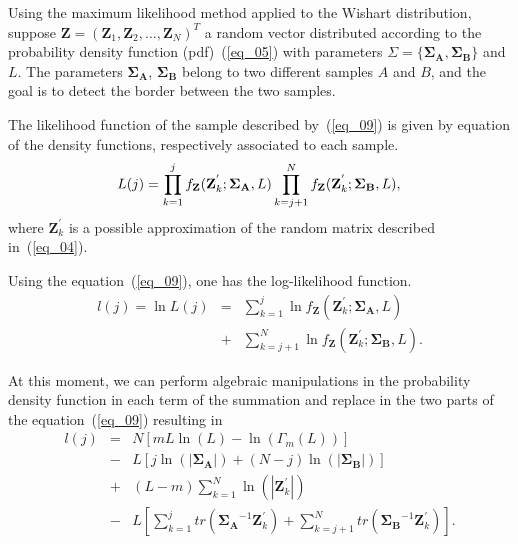 \documentclass[conference]{IEEEtran}
\begin{document}
Using the maximum likelihood method applied to the Wishart distribution, suppose $\mathbf{Z}=(\mathbf{Z}_1,\mathbf{Z}_2,\dots,\mathbf{Z}_N)^T$ a random vector distributed according to the probability density function (pdf)~(\ref{eq_05}) with parameters $\Sigma=\{\mathbf{\Sigma_A}, \mathbf{\Sigma_B}\}$ and $L$. The parameters $\mathbf{\Sigma_A}$, $\mathbf{\Sigma_B}$ belong to two different samples $A$ and $B$, and the goal is to detect the border between the two samples.

The likelihood function of the sample described by~(\ref{eq_09}) is given by equation of the density functions, respectively associated to each sample.
\begin{equation}\label{eq_10}
	L(j)=\prod_{k=1}^{j}f_{\mathbf{Z}}(\mathbf{Z}_{k}^{'};\mathbf{\Sigma_{A}},L) \prod_{k=j+1}^{N}f_{\mathbf{Z}}(\mathbf{Z}_{k}^{'};\mathbf{\Sigma_{B}},L), \\
\end{equation}
where $\mathbf{Z}_{k}^{'}$ is a possible approximation of the random matrix described in~(\ref{eq_04}).

Using the equation~(\ref{eq_09}), one has the log-likelihood function.
\begin{equation}
\begin{array}{rcl}\label{eq_11}
	l(j)=\ln L(j)&=&\sum_{k=1}^{j}\ln f_{\mathbf{Z}}(\mathbf{Z}_{k}^{'};\mathbf{\Sigma_{A}},L)\\
	             &+&\sum_{k=j+1}^{N}\ln f_{\mathbf{Z}}(\mathbf{Z}_{k}^{'};\mathbf{\Sigma_{B}},L).
\end{array}
\end{equation}

At this moment, we can perform algebraic manipulations in the probability density function in each term of the summation and replace in the two parts of the equation~(\ref{eq_09}) resulting in
\begin{equation}
\begin{array}{lll}\label{eq_12}
	l(j)&=&N\left[mL\ln{\left(L\right)}-\ln{\left(\Gamma_m(L)\right)}\right]\\
	&-& L\left[j\ln{\left(|\mathbf{\Sigma_{A}}|\right)}+(N-j)\ln{\left(|\mathbf{\Sigma_{B}}|\right)}\right] \\
	&+&(L-m)\sum_{k=1}^{N}\ln{\left(|\mathbf{Z}_{k}^{'}|\right)}\\
	&-&L\left[\sum_{k=1}^{j}tr(\mathbf{\Sigma_{A}}^{-1}\mathbf{Z}_{k}^{'})+ \sum_{k=j+1}^{N}tr(\mathbf{\Sigma_{B}}^{-1}\mathbf{Z}_{k}^{'})\right]. \\
\end{array}
\end{equation}
\end{document}
